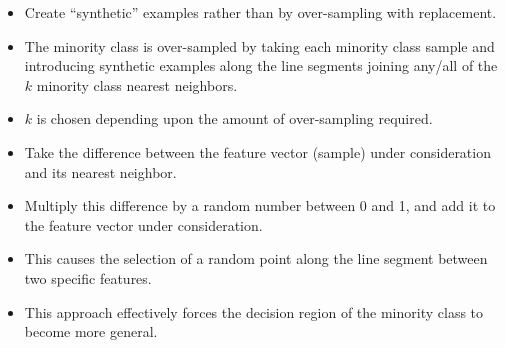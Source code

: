 \documentclass[]{article}
\providecommand{\tightlist}{%
  \setlength{\itemsep}{0pt}\setlength{\parskip}{0pt}}
\begin{document}
\begin{itemize}
  \begin{itemize}
  \tightlist
  \item
    Create ``synthetic'' examples rather than by over-sampling with
    replacement.
  \item
    The minority class is over-sampled by taking each minority class
    sample and introducing synthetic examples along the line segments
    joining any/all of the \(k\) minority class nearest neighbors.
  \item
    \(k\) is chosen depending upon the amount of over-sampling required.
  \item
    Take the difference between the feature vector (sample) under
    consideration and its nearest neighbor.
  \item
    Multiply this difference by a random number between 0 and 1, and add
    it to the feature vector under consideration.
  \item
    This causes the selection of a random point along the line segment
    between two specific features.
  \item
    This approach effectively forces the decision region of the minority
    class to become more general.
  \end{itemize}
\end{itemize}
\end{document}
